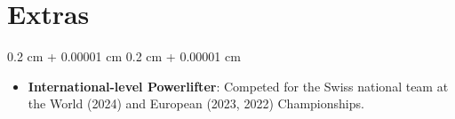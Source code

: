 \documentclass[10pt, letterpaper]{article}
\newenvironment{highlights}{
    \begin{itemize}[
        topsep=0.10 cm,
        parsep=0.10 cm,
        partopsep=0pt,
        itemsep=0pt,
        leftmargin=0.4 cm + 10pt
    ]
}{
    \end{itemize}
} %
\newenvironment{onecolentry}{
    \begin{adjustwidth}{
        0.2 cm + 0.00001 cm
    }{
        0.2 cm + 0.00001 cm
    }
}{
    \end{adjustwidth}
} %
\begin{document}
\section{Extras}

\begin{onecolentry}
    \begin{highlights}
        \item \textbf{International-level Powerlifter}: Competed for the Swiss national team at the World (2024) and European (2023, 2022) Championships.
        
        \end{highlights}
\end{onecolentry}
\end{document}
